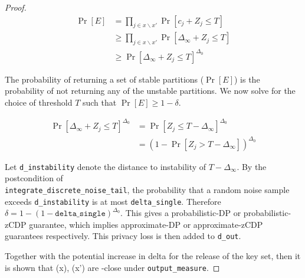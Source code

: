 \documentclass{article}
\begin{document}
\begin{proof}
\begin{align*}
    \Pr[E] &= \prod_{j \in x \backslash x'} \Pr[c_j + Z_j \le T] \\
    &\ge \prod_{j \in x \backslash x'} \Pr[\Delta_\infty + Z_j \le T] \\
    &\ge \Pr[\Delta_\infty + Z_j \le T]^{\Delta_0}
\end{align*}

The probability of returning a set of stable partitions ($\Pr[E]$) 
is the probability of not returning any of the unstable partitions.
We now solve for the choice of threshold $T$ such that $\Pr[E] \ge 1 - \delta$.

\begin{align*}
    \Pr[\Delta_\infty + Z_j \le T]^{\Delta_0} &= \Pr[Z_j \le T - \Delta_\infty]^{\Delta_0} \\
    &= (1 - \Pr[Z_j > T - \Delta_\infty])^{\Delta_0}
\end{align*}

Let \texttt{d\_instability} denote the distance to instability of $T - \Delta_\infty$.
By the postcondition of \\ \texttt{integrate\_discrete\_noise\_tail},
the probability that a random noise sample exceeds \texttt{d\_instability} is at most \texttt{delta\_single}.
Therefore $\delta = 1 - (1 - \texttt{delta\_single})^{\Delta_0}$.
This gives a probabilistic-DP or probabilistic-zCDP guarantee,
which implies approximate-DP or approximate-zCDP guarantees respectively.
This privacy loss is then added to \texttt{d\_out}.

Together with the potential increase in delta for the release of the key set,
then it is shown that \function(x), \function(x') are \dout-close under \texttt{output\_measure}.

\end{proof}



\end{document}
